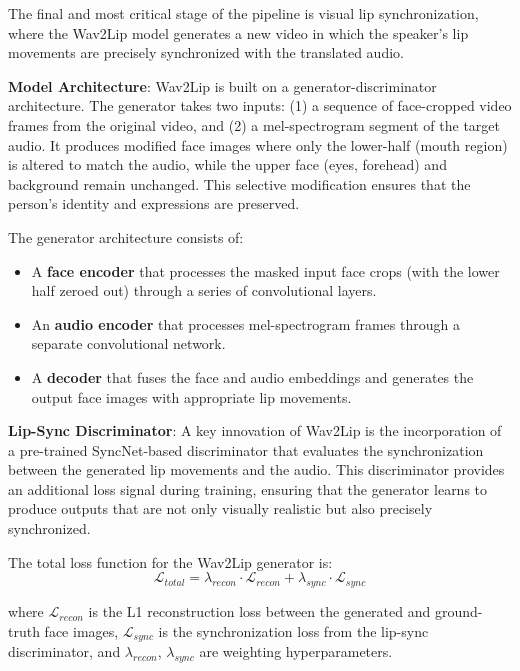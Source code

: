 \documentclass[conference]{IEEEtran}
\begin{document}
The final and most critical stage of the pipeline is visual lip synchronization, where the Wav2Lip model \cite{b5} generates a new video in which the speaker's lip movements are precisely synchronized with the translated audio.

\textbf{Model Architecture}: Wav2Lip is built on a generator-discriminator architecture. The generator takes two inputs: (1) a sequence of face-cropped video frames from the original video, and (2) a mel-spectrogram segment of the target audio. It produces modified face images where only the lower-half (mouth region) is altered to match the audio, while the upper face (eyes, forehead) and background remain unchanged. This selective modification ensures that the person's identity and expressions are preserved.

The generator architecture consists of:
\begin{itemize}
    \item A \textbf{face encoder} that processes the masked input face crops (with the lower half zeroed out) through a series of convolutional layers.
    \item An \textbf{audio encoder} that processes mel-spectrogram frames through a separate convolutional network.
    \item A \textbf{decoder} that fuses the face and audio embeddings and generates the output face images with appropriate lip movements.
\end{itemize}

\textbf{Lip-Sync Discriminator}: A key innovation of Wav2Lip is the incorporation of a pre-trained SyncNet-based discriminator that evaluates the synchronization between the generated lip movements and the audio. This discriminator provides an additional loss signal during training, ensuring that the generator learns to produce outputs that are not only visually realistic but also precisely synchronized.

The total loss function for the Wav2Lip generator is:
\begin{equation}
\mathcal{L}_{total} = \lambda_{recon} \cdot \mathcal{L}_{recon} + \lambda_{sync} \cdot \mathcal{L}_{sync}
\label{eq:wav2lip_loss}
\end{equation}

where $\mathcal{L}_{recon}$ is the L1 reconstruction loss between the generated and ground-truth face images, $\mathcal{L}_{sync}$ is the synchronization loss from the lip-sync discriminator, and $\lambda_{recon}$, $\lambda_{sync}$ are weighting hyperparameters.
\end{document}
